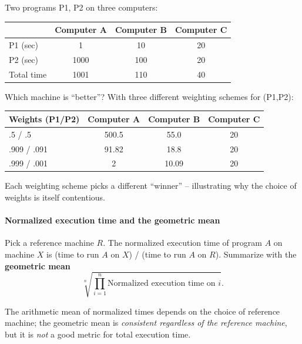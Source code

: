 \begin{eg}
Two programs P1, P2 on three computers:
\begin{center}
\begin{tabular}{@{}lccc@{}}
\toprule
 & Computer A & Computer B & Computer C \\
\midrule
P1 (sec)   & 1    & 10  & 20 \\
P2 (sec)   & 1000 & 100 & 20 \\
Total time & 1001 & 110 & 40 \\
\bottomrule
\end{tabular}
\end{center}
Which machine is ``better''? With three different weighting schemes for
(P1,P2):
\begin{center}
\begin{tabular}{@{}lccc@{}}
\toprule
Weights (P1/P2) & Computer A & Computer B & Computer C \\
\midrule
.5 / .5     & 500.5 & 55.0  & 20 \\
.909 / .091 & 91.82 & 18.8  & 20 \\
.999 / .001 & 2     & 10.09 & 20 \\
\bottomrule
\end{tabular}
\end{center}
Each weighting scheme picks a different ``winner'' -- illustrating why the
choice of weights is itself contentious.
\end{eg}

\paragraph{Normalized execution time and the geometric mean}
\begin{definition}
Pick a reference machine $R$. The normalized execution time of program $A$
on machine $X$ is (time to run $A$ on $X$) / (time to run $A$ on $R$).
Summarize with the \textbf{geometric mean}
\[
  \sqrt[n]{\prod_{i=1}^{n} \text{Normalized execution time on } i}.
\]
\end{definition}
\begin{remark}
The arithmetic mean of normalized times depends on the choice of reference
machine; the geometric mean is \emph{consistent regardless of the reference
machine}, but it is \emph{not} a good metric for total execution time.
\end{remark}

